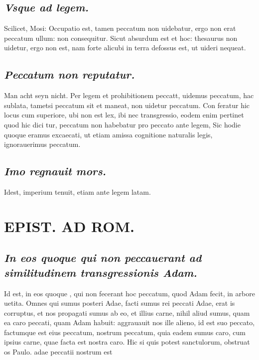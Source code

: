 \documentclass{article}
\begin{document}
\begin{pages}
\subsection*{\textit{Vsque ad legem. }}\pstart Scilicet, Mosi: Occupatio est, tamen peccatum non uidebatur, ergo non erat peccatum ullum: non consequitur. Sicut absurdum est et hoc: thesaurus non uidetur, ergo non est, nam forte alicubi in terra defossus est, ut uideri nequeat.   \pend
{}
{}
\subsection*{\textit{Peccatum non reputatur. }}\pstart Man acht seyn nicht. Per legem et prohibitionem peccatt, uidemus peccatum, hac sublata, tametsi peccatum sit et maneat, non uidetur peccatum. Con feratur hic locus cum superiore, ubi non est lex, ibi nec transgressio, eodem enim pertinet quod hic dici tur, peccatum non habebatur pro peccato ante legem, Sic hodie quoque eramus excaecati, ut etiam amissa cognitione naturalis legis, ignorauerimus peccatum.   \pend
{}
{}
\subsection*{\textit{Imo regnauit mors. }}\pstart Idest, imperium tenuit, etiam ante legem latam.   \pend
\section*{EPIST. AD ROM.  }
\marginpar{[ p.53 ]}
{}
\subsection*{\textit{In eos quoque qui non peccauerant ad similitudinem transgressionis Adam. }}\pstart Id est, in eos quoque , qui non fecerant hoc peccatum, quod Adam fecit, in arbore uetita. Omnes qui sumus posteri Adae, facti sumus rei peccati Adae, erat is corruptus, et nos propagati sumus ab eo, et illius carne, nihil aliud sumus, quam ea caro peccati, quam Adam habuit: aggrauauit nos ille alieno, id est suo peccato, factumque est eius peccatum, nostrum peccatum, quia eadem sumus caro, cum ipsius carne, quae facta est nostra caro. Hic si quis potest sanctulorum, obstruat os Paulo.  adae peccatii nostrum est\pend
{}
{}

\end{pages}
\end{document}
